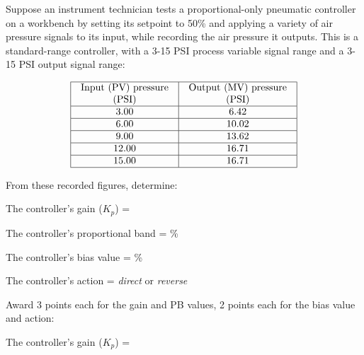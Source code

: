 

Suppose an instrument technician tests a proportional-only pneumatic controller on a workbench by setting its setpoint to 50\% and applying a variety of air pressure signals to its input, while recording the air pressure it outputs.  This is a standard-range controller, with a 3-15 PSI process variable signal range and a 3-15 PSI output signal range:


$$\vbox{\offinterlineskip
\halign{\strut
\vrule \quad\hfil # \ \hfil & 
\vrule \quad\hfil # \ \hfil \vrule \cr
\noalign{\hrule}
%
Input (PV) pressure & Output (MV) pressure \cr
(PSI) & (PSI) \cr
%
\noalign{\hrule}
%
3.00 & 6.42 \cr
%
\noalign{\hrule}
%
6.00 & 10.02 \cr
%
\noalign{\hrule}
%
9.00 & 13.62 \cr
%
\noalign{\hrule}
%
12.00 & 16.71 \cr
%
\noalign{\hrule}
%
15.00 & 16.71 \cr
%
\noalign{\hrule}
} %
}$$ %

\vskip 10pt

From these recorded figures, determine:

\vskip 10pt

The controller's gain ($K_p$) = \underbar{\hskip 50pt}

\vskip 10pt

The controller's proportional band = \underbar{\hskip 50pt} \%

\vskip 10pt

The controller's bias value = \underbar{\hskip 50pt} \%

\vskip 10pt

The controller's action = {\it direct} or {\it reverse}








Award 3 points each for the gain and PB values, 2 points each for the bias value and action:

\vskip 10pt

The controller's gain ($K_p$) = 

